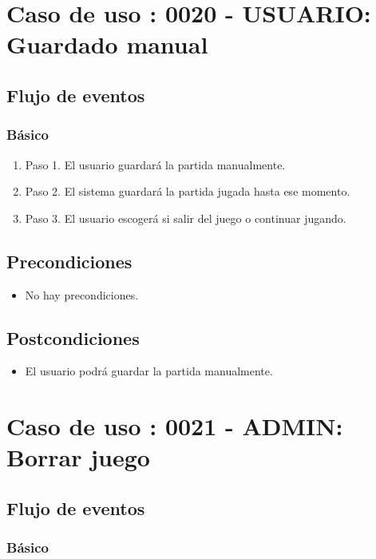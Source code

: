 \section{Caso de uso : 0020 - USUARIO: Guardado manual}\label{sec:uc0}
\subsection{Flujo de eventos}
\subsubsection{Básico}

\begin{enumerate}
\item Paso 1.
El usuario guardará la partida manualmente.  
\item Paso 2.
El sistema guardará la partida jugada hasta ese momento. 
\item Paso 3.
El usuario escogerá si salir del juego o continuar jugando. 
\end{enumerate}

\subsection{Precondiciones}
\begin{itemize}
\item No hay precondiciones.
\end{itemize}

\subsection{Postcondiciones}
\begin{itemize}
\item El usuario podrá guardar la partida manualmente. 
\end{itemize}



\section{Caso de uso : 0021 - ADMIN: Borrar juego}\label{sec:uc0}
\subsection{Flujo de eventos}
\subsubsection{Básico}

